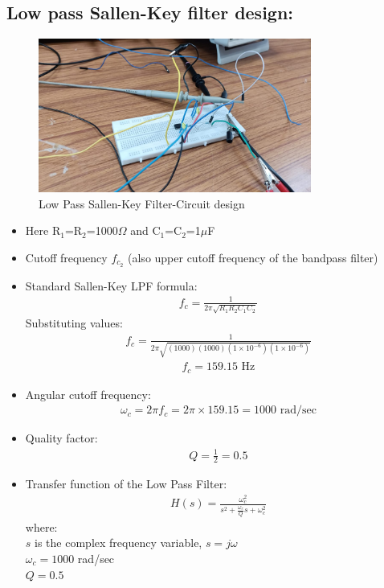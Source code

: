 \documentclass{article}
\begin{document}
\subsection{Low pass Sallen-Key filter design:}

\begin{figure}[H]
    \centering
    \includegraphics[width=0.8\textwidth]{figs/lowpasscircuit.jpeg}
    \caption{Low Pass Sallen-Key Filter-Circuit design}
\end{figure}

\begin{itemize}
    \item Here R$_1$=R$_2$=1000$\Omega$ and C$_1$=C$_2$=1$\mu$F
    \item Cutoff frequency $f_{c_2}$ (also upper cutoff frequency of the bandpass filter)
    \item Standard Sallen-Key LPF formula:
    \begin{align}
        f_c = \frac{1}{2\pi\sqrt{R_1R_2C_1C_2}}
    \end{align}
    Substituting values:
    \begin{align}
        f_c = \frac{1}{2\pi\sqrt{(1000)(1000)(1 \times 10^{-6})(1 \times 10^{-6})}}
    \end{align}
    \begin{align}
        f_c = 159.15 \text{ Hz}
    \end{align}
    \item Angular cutoff frequency:
    \begin{align}
        \omega_c = 2\pi f_c = 2\pi \times 159.15 = 1000 \text{ rad/sec}
    \end{align}
    \item Quality factor:
    \begin{align}
        Q = \frac{1}{2} = 0.5
    \end{align}
    \item Transfer function of the Low Pass Filter:
    \begin{align}
        H(s) = \frac{\omega_c^2}{s^2 + \frac{\omega_c}{Q}s + \omega_c^2}
    \end{align}
    where:\\
    $s$ is the complex frequency variable, $s = j\omega$ \\
    $\omega_c = 1000$ rad/sec \\
    $Q = 0.5$
\end{itemize}
\end{document}
